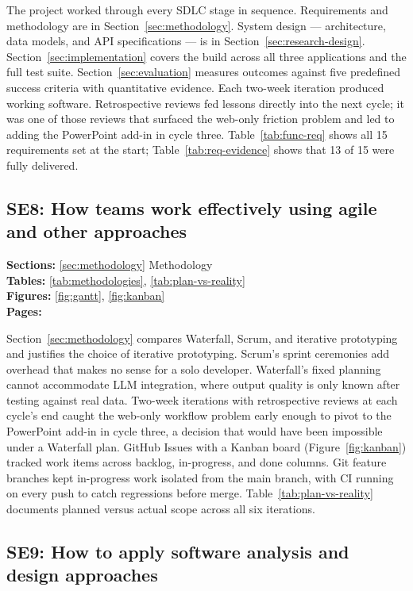 The project worked through every SDLC stage in sequence. Requirements and methodology are in Section~\ref{sec:methodology}. System design — architecture, data models, and API specifications — is in Section~\ref{sec:research-design}. Section~\ref{sec:implementation} covers the build across all three applications and the full test suite. Section~\ref{sec:evaluation} measures outcomes against five predefined success criteria with quantitative evidence. Each two-week iteration produced working software. Retrospective reviews fed lessons directly into the next cycle; it was one of those reviews that surfaced the web-only friction problem and led to adding the PowerPoint add-in in cycle three. Table~\ref{tab:func-req} shows all 15 requirements set at the start; Table~\ref{tab:req-evidence} shows that 13 of 15 were fully delivered.

\subsection*{SE8: How teams work effectively using agile and other approaches}

\noindent\textbf{Sections:} \ref{sec:methodology} Methodology\\
\noindent\textbf{Tables:} \ref{tab:methodologies}, \ref{tab:plan-vs-reality}\\
\noindent\textbf{Figures:} \ref{fig:gantt}, \ref{fig:kanban}\\
\noindent\textbf{Pages:} \pageref{sec:methodology}

Section~\ref{sec:methodology} compares Waterfall, Scrum, and iterative prototyping and justifies the choice of iterative prototyping. Scrum's sprint ceremonies add overhead that makes no sense for a solo developer. Waterfall's fixed planning cannot accommodate LLM integration, where output quality is only known after testing against real data. Two-week iterations with retrospective reviews at each cycle's end caught the web-only workflow problem early enough to pivot to the PowerPoint add-in in cycle three, a decision that would have been impossible under a Waterfall plan. GitHub Issues with a Kanban board (Figure~\ref{fig:kanban}) tracked work items across backlog, in-progress, and done columns. Git feature branches kept in-progress work isolated from the main branch, with CI running on every push to catch regressions before merge. Table~\ref{tab:plan-vs-reality} documents planned versus actual scope across all six iterations.

\subsection*{SE9: How to apply software analysis and design approaches}

